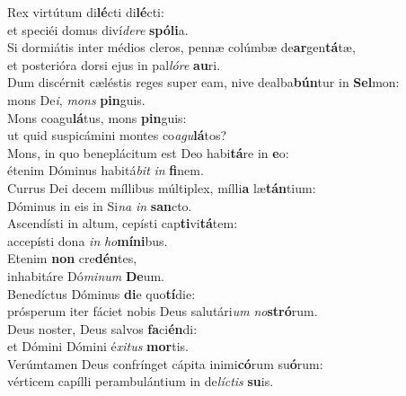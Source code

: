 \oddverse Rex virtútum di\textbf{lé}cti di\textbf{lé}cti:~\*\\
\oddverse et speciéi domus diví\textit{de}\textit{re} \textbf{spó}\textbf{li}a.\\
\evenverse Si dormiátis inter médios cleros, pennæ colúmbæ de\textbf{ar}gen\textbf{tá}tæ,~\*\\
\evenverse et posterióra dorsi ejus in pal\textit{ló}\textit{re} \textbf{au}ri.\\
\oddverse Dum discérnit cæléstis reges super eam, nive dealba\textbf{bún}tur in \textbf{Sel}mon:~\*\\
\oddverse mons De\textit{i}, \textit{mons} \textbf{pin}guis.\\
\evenverse Mons coagu\textbf{lá}tus, mons \textbf{pin}guis:~\*\\
\evenverse ut quid suspicámini montes co\textit{a}\textit{gu}\textbf{lá}tos?\\
\oddverse Mons, in quo beneplácitum est Deo habi\textbf{tá}re in \textbf{e}o:~\*\\
\oddverse étenim Dóminus habitá\textit{bit} \textit{in} \textbf{fi}nem.\\
\evenverse Currus Dei decem míllibus múltiplex, mílli\textbf{a} læ\textbf{tán}tium:~\*\\
\evenverse Dóminus in eis in Si\textit{na} \textit{in} \textbf{san}cto.\\
\oddverse Ascendísti in altum, cepísti cap\textbf{ti}vi\textbf{tá}tem:~\*\\
\oddverse accepísti dona \textit{in} \textit{ho}\textbf{mí}\textbf{ni}bus.\\
\evenverse Etenim \textbf{non} cre\textbf{dén}tes,~\*\\
\evenverse inhabitáre Dó\textit{mi}\textit{num} \textbf{De}um.\\
\oddverse Benedíctus Dóminus \textbf{di}e quo\textbf{tí}die:~\*\\
\oddverse prósperum iter fáciet nobis Deus salutári\textit{um} \textit{no}\textbf{stró}rum.\\
\evenverse Deus noster, Deus salvos \textbf{fa}ci\textbf{én}di:~\*\\
\evenverse et Dómini Dómini é\textit{xi}\textit{tus} \textbf{mor}tis.\\
\oddverse Verúmtamen Deus confrínget cápita inimi\textbf{có}rum su\textbf{ó}rum:~\*\\
\oddverse vérticem capílli perambulántium in de\textit{lí}\textit{ctis} \textbf{su}is.\\
